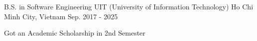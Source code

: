 \begin{cventries}
    \cventry
    {B.S. in Software Engineering}
    {UIT (University of Information Technology)}
    {Ho Chi Minh City, Vietnam}
    {Sep. 2017 - 2025}
    {
        \begin{cvitems}
            \item {Got an Academic Scholarship in 2nd Semester}
        \end{cvitems}
    }
\end{cventries}
